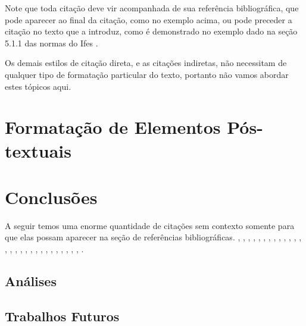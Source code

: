 \documentclass[times,english,brazilian,oneside,section=TITLE]{ifes8}
\begin{document}
Note que toda citação deve vir acompanhada de sua referência
bibliográfica, que pode aparecer ao final da citação, como no exemplo
acima, ou pode preceder a citação no texto que a introduz, como é
demonstrado no exemplo dado na seção 5.1.1 das normas do Ifes
\cite[p.~39]{Ifes2024}.

Os demais estilos de citação direta, e as citações indiretas, não
necessitam de qualquer tipo de formatação particular do texto,
portanto não vamos abordar estes tópicos aqui.



\chapter{Formatação de Elementos Pós-textuais}
\label{cha:format-pos-text}



\chapter{Conclusões}

A seguir temos uma enorme quantidade de citações sem contexto somente
para que elas possam aparecer na seção de referências bibliográficas.
\cite{abntex2classe}, \cite{abntex2-wiki-como-customizar},
\cite{abntex2modelo-artigo}, \cite{abntex2modelo-relatorio},
\cite{abntex2modelo}, \cite{abntex2cite}, \cite{abntex2cite-alf},
\cite{Ifes2024}, \cite{NBR6024:2012}, \cite{araujo2012},
\cite{talbot2012}, \cite{NBR14724:2011}, \cite{EIA649B},
\cite{bates2010}, \cite{memoir}, \cite{masolo2010}, \cite{babel},
\cite{NBR14724:2005}, \cite{macedo2005}, \cite{guizzardi2005},
\cite{NBR6028:2003}, \cite{NBR10520:2023}, \cite{NBR14724:2002},
\cite{NBR14724:2001}, \cite{guarino1995}, \cite{ibge1993},
\cite{van86}, \cite{dewey1980}, \cite{doxiadis1965}.

\section{Análises}

\blindtext[7]

\section{Trabalhos Futuros}

\blindtext[7]
\end{document}

